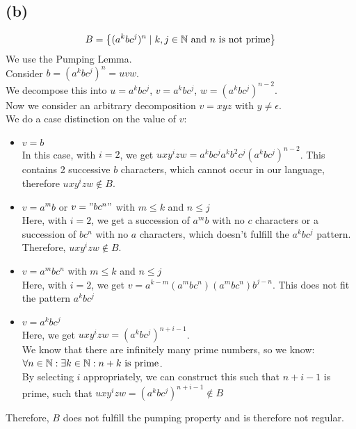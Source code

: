 \subsection{(b)}
$$B = \left\{ (a^{k}bc^{j})^{n} \mid k,j \in \mathbb{N}\text{ and }n\text{ is not prime} \right\}$$
We use the Pumping Lemma.\\
Consider $b=(a^{k}bc^{j})^{n} = uvw$.\\
We decompose this into $u=a^{k}bc^{j}$, $v=a^{k}bc^{j}$, $w=(a^{k}bc^{j})^{n-2}$.\\
Now we consider an arbitrary decomposition $v=xyz$ with $y\neq \epsilon$.\\
We do a case distinction on the value of $v$:
\begin{itemize}
    \item $v= b$\\
    In this case, with $i=2$, we get $uxy^{i}zw = a^{k}bc^{j}a^{k}b^{2}c^{j}(a^{k}bc^{j})^{n-2}$. This contains 2 successive $b$ characters, which cannot occur in our language, therefore $uxy^{i}zw \notin B$.
    \item $v= a^{m}b$ or $v= "bc^{n}"$ with $m \leq k$ and $n \leq j$\\
    Here, with $i=2$, we get a succession of $a^{m}b$ with no $c$ characters or a succession of $bc^{n}$ with no $a$ characters, which doesn't fulfill the $a^{k}bc^{j}$ pattern. Therefore, $uxy^{i}zw \notin B$.
    \item $v= a^{m}bc^{n}$ with $m \leq k$ and $n \leq j$\\
    Here, with $i=2$, we get $v=a^{k-m}(a^{m}bc^{n})(a^{m}bc^{n})b^{j-n}$. This does not fit the pattern $a^{k}bc^{j}$
    \item $v= a^{k}bc^{j}$\\
    Here, we get $uxy^{i}zw = (a^{k}bc^{j})^{n+i-1}$.\\
    We know that there are infinitely many prime numbers, so we know: $\forall n \in \mathbb{N}: \exists k \in \mathbb{N}: n+k \text{ is prime}$.\\
    By selecting $i$ appropriately, we can construct this such that $n+i-1$ is prime, such that $uxy^{i}zw = (a^{k}bc^{j})^{n+i-1} \notin B$
\end{itemize}
Therefore, $B$ does not fulfill the pumping property and is therefore not regular.


